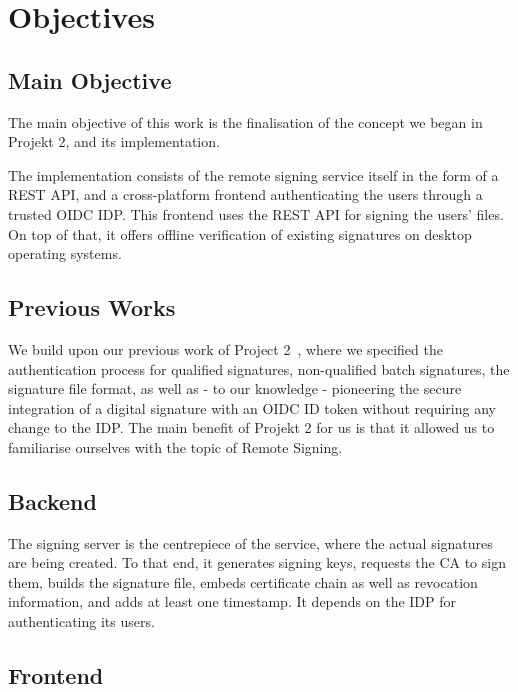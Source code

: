 \chapter{Objectives}
\label{ch:objectives}

\section{Main Objective}\label{subsec:main-objective}
The main objective of this work is the finalisation of the concept we began in Projekt 2,
and its implementation.

The implementation consists of the remote signing service itself in the form of a \gls{REST} \gls{API},
and a cross-platform frontend authenticating the users through a trusted \gls{OIDC} \gls{IDP}.
This frontend uses the \gls{REST} \gls{API} for signing the users' files.
On top of that, it offers offline verification of existing signatures on desktop operating systems.

\section{Previous Works}
\label{section:previousworks}

We build upon our previous work of Project 2~\cite{projekt2}, where we specified the authentication process
for qualified signatures, non-qualified batch signatures, the signature file format,
as well as - to our knowledge - pioneering the secure integration of a digital signature with an \gls{OIDC} ID token without requiring any change to the \gls{IDP}.
The main benefit of Projekt 2 for us is that it allowed us to familiarise ourselves with the topic of Remote Signing.


\section{Backend}
\label{section:backend}

The signing server is the centrepiece of the service, where the actual signatures are being created.
To that end, it generates signing keys,
requests the \gls{CA} to sign them,
builds the signature file, embeds certificate chain as well as revocation information,
and adds at least one timestamp.
It depends on the \gls{IDP} for authenticating its users.

\section{Frontend}
\label{section:frontend}

